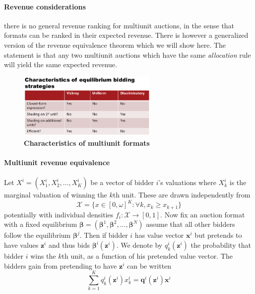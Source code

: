 \paragraph{Revenue considerations} there is no general revenue ranking for multiunit auctions, in the sense that formats can be ranked in their expected revenue. There is however a generalized version of the revenue equivalence theorem which we will show here. The statement is that any two multiunit auctions which have the same \textit{allocation} rule will yield the same expected revenue. 
\begin{figure}
    \includegraphics[width=0.6\textwidth]{figures/characteristics.png}
    \caption{\textbf{Characteristics of multiunit formats}}
\end{figure}

\paragraph{Multiunit revenue equivalence}
Let $X^i=(X_1^i, X_2^i, ..., X_K^i)$ be a vector of bidder $i$'s valuations where $X_k^i$ is the marginal valuation of winning the $k$th unit. These are drawn independently from 
\begin{equation}
    \mathcal{X} = \{x \in [0,\omega]^K
    : \forall k, x_k \geq x_{k+1} 
    \}
\end{equation}
potentially with individual densities $f_i:\mathcal{X}\rightarrow [0,1]$. Now fix an auction format with a fixed equilibrium $\bm\beta=(\bm\beta^1, \bm\beta^2, ...,\bm\beta^N)$ assume that all other bidders follow the equilibrium $\bm\beta^j$. Then if bidder $i$ has value vector $\bm{x}^i$ but pretends to have values $\bm{z}^i$ and thus bids $\bm\beta^i(\bm{z}^i)$. We denote by $q_k^i(\bm{z}^i)$ the probability that bidder $i$ wins the $k$th unit, as a function of his pretended value vector. The bidders gain from pretending to have $\bm{z}^i$ can be written 
\begin{equation}
    \sum_{k=1}^K q_k^i(\bm{z}^i)x_k^i = \bm{q}^i(\bm{z}^i) \bm{x}^i
\end{equation}

